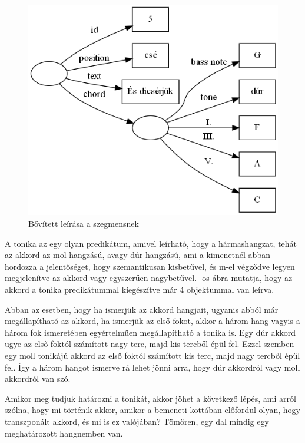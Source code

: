 \begin{figure}[h]
	\includegraphics[scale=0.5]{images/img_src/rdf_graph_4.png}
	\caption{Bővített leírása a szegmensnek}
	\label{fig:graph4}
\end{figure}

A tonika az egy olyan predikátum, amivel leírható, hogy a hármashangzat, tehát az akkord az mol hangzású, avagy dúr hangzású, ami a kimenetnél abban hordozza a jelentőséget, hogy szemantikusan kisbetűvel, és m-el végződve legyen megjelenítve az akkord vagy egyszerűen nagybetűvel. -os ábra mutatja, hogy az akkord a tonika predikátummal kiegészítve már 4 objektummal van leírva.

Abban az esetben, hogy ha ismerjük az akkord hangjait, ugyanis abból már megállapítható az akkord, ha ismerjük az első fokot, akkor a három hang vagyis a három fok ismeretében egyértelműen megállapítható a tonika is. Egy dúr akkord ugye az első foktól számított nagy terc, majd kis tercből épül fel. Ezzel szemben egy moll tonikájú akkord az első foktól számított kis terc, majd nagy tercből épül fel. Így a három hangot ismerve rá lehet jönni arra, hogy dúr akkordról vagy moll akkordról van szó.

Amikor meg tudjuk határozni a tonikát, akkor jöhet a következő lépés, ami arról szólna, hogy mi történik akkor, amikor a bemeneti kottában előfordul olyan, hogy transzponált akkord, és mi is ez valójában? Tömören, egy dal mindig egy meghatározott hangnemben van.

